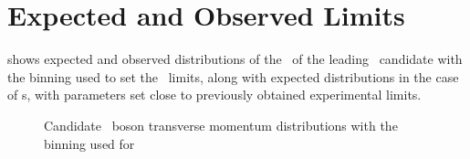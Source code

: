\section{Expected and Observed Limits}
\label{sec:TGC-ExpObsLimits}

 shows expected and observed distributions of the \pt\ of the
leading \Z\ candidate with the binning used to set the \TGC\ limits, along with
expected distributions in the case of \TGC s, with parameters set close to
previously obtained experimental limits.

\begin{figure}[htbp]
\begin{center}
\caption[Candidate \Z\ boson transverse momentum distributions with the binning used for
\TGC\ limit setting.]
{Candidate \Z\ boson transverse momentum distributions with the binning used for
}
\end{center}
\end{figure}
